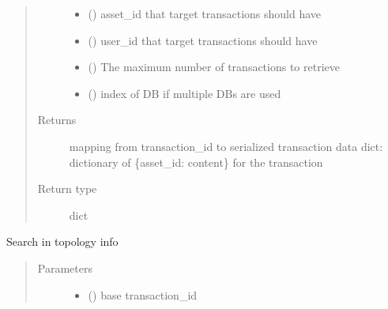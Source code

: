\documentclass[letterpaper,10pt,english]{sphinxmanual}
\begin{document}
\begin{fulllineitems}
\begin{fulllineitems}
\begin{quote}
\begin{description}
\begin{itemize}
\item {} 
 () \textendash{} asset\_id that target transactions should have

\item {} 
 () \textendash{} user\_id that target transactions should have

\item {} 
 () \textendash{} The maximum number of transactions to retrieve

\item {} 
 () \textendash{} index of DB if multiple DBs are used

\end{itemize}

\item[{Returns}] \leavevmode
mapping from transaction\_id to serialized transaction data
dict: dictionary of \{asset\_id: content\} for the transaction

\item[{Return type}] \leavevmode
dict

\end{description}\end{quote}

\end{fulllineitems}


\begin{fulllineitems}
\label{\detokenize{bbc1.core.data_handler:bbc1.core.data_handler.DataHandler.search_transaction_topology}}
Search in topology info
\begin{quote}\begin{description}
\item[{Parameters}] \leavevmode\begin{itemize}
\item {} 
 () \textendash{} base transaction\_id


\end{itemize}
\end{description}
\end{quote}
\end{fulllineitems}
\end{fulllineitems}
\end{document}
